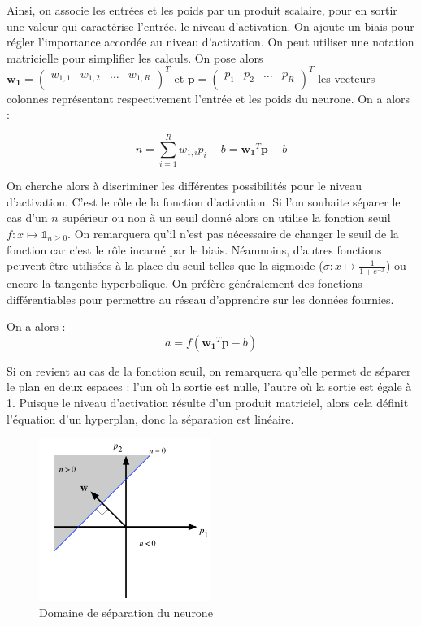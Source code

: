 Ainsi, on associe les entrées et les poids par un produit scalaire, pour en sortir une valeur qui caractérise l'entrée, le niveau d'activation.
On ajoute un biais pour régler l'importance accordée au niveau d'activation. On peut utiliser une notation matricielle pour simplifier les calculs.
On pose alors $\mathbf{w_1} = 
\begin{pmatrix}
  w_{1,1} & w_{1,2} & \ldots & w_{1,R}\\
\end{pmatrix}^T $ 
et
$ \mathbf{p} = 
\begin{pmatrix}
 p_1 & p_2 & \ldots & p_R \\
\end{pmatrix}^T $ 
les vecteurs colonnes représentant respectivement l'entrée et les poids du neurone. On a alors :

\begin{equation} 
n = \sum_{i=1}^{R} w_{1,i} p_i - b = \mathbf{w_1}^T \mathbf{p} - b
\end{equation}

On cherche alors à discriminer les différentes possibilités pour le niveau d'activation. C'est le rôle de la fonction d'activation. Si l'on souhaite séparer
le cas d'un $n$ supérieur ou non à un seuil donné alors on utilise la fonction seuil $ f : x \mapsto \mathds{1}_{n \geq 0} $. On remarquera qu'il n'est 
pas nécessaire de changer le seuil de la fonction car c'est le rôle incarné par le biais. Néanmoins, d'autres fonctions peuvent être utilisées à la place
du seuil telles que la sigmoide ($\sigma : x \mapsto \frac{1}{1+e^{-x}}$) ou encore la tangente hyperbolique. 
On préfère généralement des fonctions différentiables pour permettre au réseau d'apprendre sur les données fournies.

On a alors : 
\begin{equation}
 a = f\left(\mathbf{w_1}^T \mathbf{p} - b\right)
\end{equation}

Si on revient au cas de la fonction seuil, on remarquera qu'elle permet de séparer le plan en deux espaces : l'un où la sortie est nulle, l'autre où
la sortie est égale à 1. Puisque le niveau d'activation résulte d'un produit matriciel, alors cela définit l'équation d'un hyperplan, donc la séparation
est linéaire.

\begin{figure}[h]
 \centering
 \includegraphics[width=0.5\textwidth]{img/separation_lineaire_du_plan.png}
 \caption{Domaine de séparation du neurone}
\end{figure}

